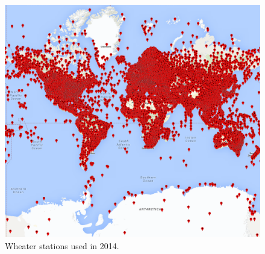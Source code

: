 \documentclass{vldb}
\begin{document}
\begin{figure}[tbh]
\includegraphics[width=1\linewidth]{stations2014}
\caption{Wheater stations used in 2014.}
\label{fig:stations2014}
\end{figure}


\FloatBarrier
\clearpage





\balance
\printbibliography
\end{document}
